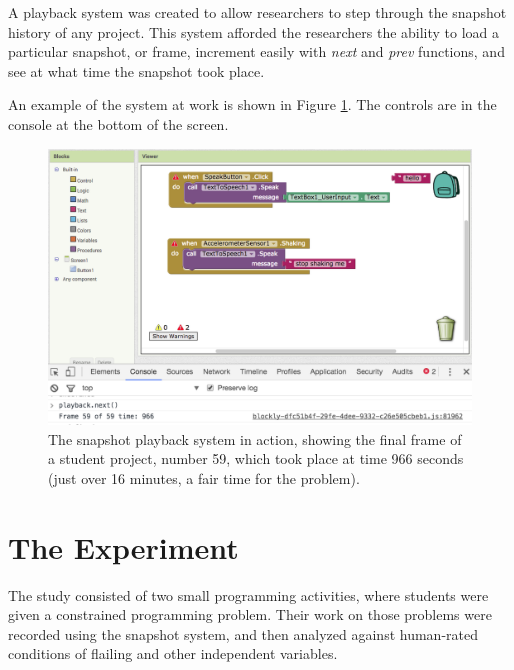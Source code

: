 A playback system was created to allow researchers to step through the snapshot history of any project. This system afforded the researchers the ability to load a particular snapshot, or frame, increment easily with \emph{next} and \emph{prev} functions, and see at what time the snapshot took place. %

An example of the system at work is shown in Figure \ref{img:playback}. The controls are in the console at the bottom of the screen.

\begin{figure}
  \centering
      \includegraphics[width=\textwidth]{images/ch3-playback}
  \caption[Snapshot playback]{The snapshot playback system in action, showing the final frame of a student project, number 59, which took place at time 966 seconds (just over 16 minutes, a fair time for the problem).}
  \label{img:playback}
\end{figure}



\section{The Experiment}

The study consisted of two small programming activities, where students were given a constrained programming problem. Their work on those problems were recorded using the snapshot system, and then analyzed against human-rated conditions of flailing and other independent variables.

